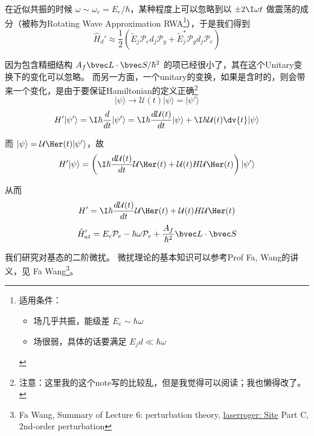 在近似共振的时候 $\omega\sim\omega_e = E_e/\hbar$，某种程度上可以忽略到以 $\pm 2\I\omega t$ 做震荡的成分（被称为Rotating Wave Approximation RWA\footnote{适用条件：
\begin{itemize}
\item 场几乎共振，能级差 $E_e \sim \hbar \omega$
\item 场很弱，具体的话要满足 $E_j d \ll \hbar\omega$ \end{itemize}}），于是我们得到
\begin{equation}
\hat{H}_d' \approx \frac{1}{2}\left(\tilde{E}_j\mathcal{P}_e d_j \mathcal{P}_g + \tilde{E}_j^*\mathcal{P}_g d_j \mathcal{P}_e\right)
\end{equation}

因为包含精细结构 $A_f\bvec L\cdot \bvec S/\hbar^2$ 的项已经很小了，其在这个Unitary变换下的变化可以忽略。 而另一方面，一个unitary的变换，如果是含时的，则会带来一个变化，是由于要保证Hamiltonian的定义正确\footnote{注意：这里我的这个note写的比较乱，但是我觉得可以阅读；我也懒得改了。}
\begin{equation}
|\psi\rangle \to \mathcal{U}(t)|\psi\rangle = |\psi'\rangle
\end{equation}
\begin{equation}
H'|\psi'\rangle = \I\hbar\frac{d}{dt}|\psi'\rangle = \I\hbar\frac{d \mathcal{U}(t)}{dt}|\psi\rangle + \I\hbar\mathcal{U}(t) \dv{t} |\psi\rangle
\end{equation}

而 $|\psi\rangle = \mathcal{U}\Her(t)|\psi'\rangle$，故
\begin{equation}
H'|\psi\rangle = \left(\I\hbar\frac{d\mathcal{U}(t)}{dt}\mathcal{U}\Her(t) + \mathcal{U}(t)H\mathcal{U}\Her(t)\right)|\psi'\rangle 
\end{equation}

从而
\begin{equation}
H'= \I\hbar\frac{d\mathcal{U}(t)}{dt}\mathcal{U}\Her(t) + \mathcal{U}(t)H\mathcal{U}\Her(t)
\end{equation}
\begin{equation}
\hat{H}'_{at} = E_e \mathcal{P}_e - \hbar\omega\mathcal{P}_e + \frac{A_{f}}{\hbar^2}\bvec L\cdot \bvec S 
\end{equation}

我们研究对基态的二阶微扰。 微扰理论的基本知识可以参考Prof Fa, Wang的讲义，见 Fa Wang\footnote{Fa Wang, Summary of Lecture 6: perturbation theory, \href{http://laserroger.github.io/PekingPhysics/ADVQM2014/Lectures/Lecture06.pdf}{laserroger: Site} Part C, 2nd-order perturbation}。

